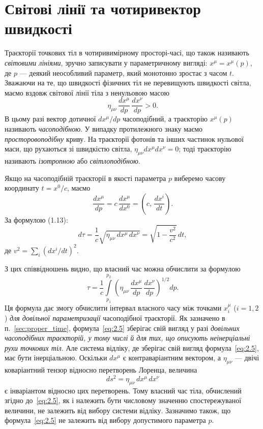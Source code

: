 \section{Світові лінії та чотиривектор швидкості}

Траєкторії точкових тіл в чотиривимірному просторі-часі, що також
називають \textit{світовими лініями}, зручно записувати у параметричному
вигляді: $x^\mu = x^\mu(p)$, де $p$ --- деякий неособливий параметр,
який монотонно зростає з часом $t$. Зважаючи на те, що швидкості
фізичних тіл не перевищують швидкості світла, маємо вздовж світової
лінії тіла з ненульовою масою
\begin{equation*}
  \eta_{\mu\nu}\,\frac{dx^\mu}{dp}\,\frac{dx^\nu}{dp} > 0.
\end{equation*}
В цьому разі вектор дотичної $dx^\mu/dp$ часоподібний, а траєкторію
$x^\mu(p)$ називають \textit{часоподібною}. У випадку протилежного знаку
маємо \textit{просторовоподібну} криву. На траєкторії фотонів та інших
частинок нульової маси, що рухаються зі швидкістю світла,
$\eta_{\mu\nu}dx^\mu dx^\nu = 0$; тоді траєкторію називають
\textit{ізотропною} або \textit{світлоподібною}.

Якщо на часоподібній траєкторії в якості параметра $p$ виберемо часову
координату $t = x^0/c$, маємо
\[
  \frac{dx^\mu}{dp} = c\,\frac{dx^\mu}{dx^0} = \left(c,\,\frac{dx^i}{dt}\right).
\]
За формулою (1.13):
\[
  d\tau = \frac{1}{c}\sqrt{\eta_{\mu\nu}\,dx^\mu\,dx^\nu}
        = \sqrt{1 - \frac{v^2}{c^2}}\,dt,
\]
де $v^2 = \sum_i (dx^i/dt)^2$.

З цих співвідношень видно, що власний час можна обчислити за формулою
\begin{equation}
  \tau = \frac{1}{c}\int\limits_{p_1}^{p_2}
    \left(\eta_{\mu\nu}\,\frac{dx^\mu}{dp}\,\frac{dx^\nu}{dp}\right)^{1/2}dp.
  \label{eq:2.5}
\end{equation}
Ця формула дає змогу обчислити інтервал власного часу між точками $x_i^\mu$
($i=1,2$) \textit{для довільної параметризації} часоподібної траєкторії.
Як зазначено в п.~\ref{sec:proper_time}, формула~\eqref{eq:2.5} зберігає свій вигляд у разі
\textit{довільних часоподібних траєкторій, у тому числі й для тих, що
описують неінерціальні рухи точкових тіл}. Але система відліку, де
зберігає свій вигляд формула~\eqref{eq:2.5}, має бути інерціальною. Оскільки
$dx^\mu$ є контраваріантним вектором, а $\eta_{\mu\nu}$ --- двічі
коваріантний тензор відносно перетворень Лоренца, величина
\[
  ds^2 = \eta_{\mu\nu}\,dx^\mu\,dx^\nu
\]
є інваріантом відносно цих перетворень. Тому власний час тіла,
обчислений згідно до~\eqref{eq:2.5}, як і належить бути числовому значенню
спостережуваної величини, не залежить від вибору системи відліку.
Зазначимо також, що формула~\eqref{eq:2.5} не залежить від вибору
допустимого параметра $p$.

